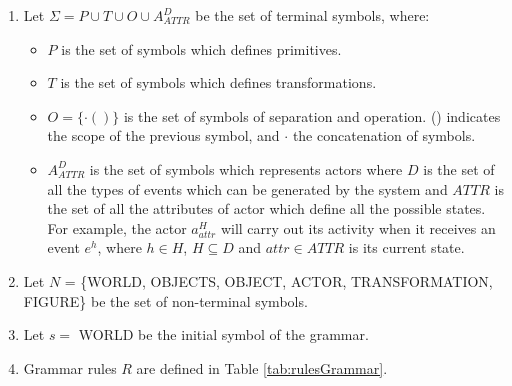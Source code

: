 \documentclass[twocolumn]{svjour3}
\begin{document}
\begin{enumerate}
    \item Let $\Sigma = P \cup T \cup O \cup A_{ATTR}^D$ be the set of terminal symbols, where:

    \begin{itemize}
        \item $P$ is the set of symbols which defines primitives.

        \item $T$ is the set of symbols which defines transformations.

        \item $O = \{ \cdotp ( ) \}$ is the set of symbols of separation
and operation. () indicates the scope of the previous symbol, and $\cdotp$ the concatenation of
symbols.
        \item $A_{ATTR}^D$ is the set of symbols which represents actors where $D$ is the set of all the types of
        events which can be generated by the system and $ATTR$ is the set of all the attributes of actor which define
        all the possible states. For example, the actor $a_{attr}^H$ will carry out its activity when it receives an
        event $e^h$, where $h \in H$, $H \subseteq D$ and $attr \in ATTR$ is its current state.
    \end{itemize}



    \item Let $N$ = \{WORLD, OBJECTS, OBJECT, ACTOR, TRANSFORMATION,
FIGURE\} be the set of non-terminal symbols.

    \item Let $s =$ WORLD be the initial symbol of the grammar.

    \item Grammar rules $R$ are defined in Table \ref{tab:rulesGrammar}.

\end{enumerate}
\end{document}
